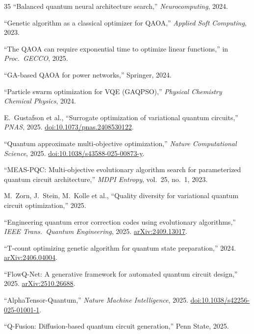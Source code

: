 \documentclass[11pt]{article}
\begin{document}
\begin{thebibliography}{35}
``Balanced quantum neural architecture search,''
\emph{Neurocomputing}, 2024.

``Genetic algorithm as a classical optimizer for QAOA,''
\emph{Applied Soft Computing}, 2023.

``The QAOA can require exponential time to optimize linear functions,''
in \emph{Proc.\ GECCO}, 2025.

``GA-based QAOA for power networks,''
Springer, 2024.

``Particle swarm optimization for VQE (GAQPSO),''
\emph{Physical Chemistry Chemical Physics}, 2024.

E.~Gustafson et al.,
``Surrogate optimization of variational quantum circuits,''
\emph{PNAS}, 2025.
\newblock \href{https://www.pnas.org/doi/10.1073/pnas.2408530122}{doi:10.1073/pnas.2408530122}.

``Quantum approximate multi-objective optimization,''
\emph{Nature Computational Science}, 2025.
\newblock \href{https://www.nature.com/articles/s43588-025-00873-y}{doi:10.1038/s43588-025-00873-y}.

``MEAS-PQC: Multi-objective evolutionary algorithm search for parameterized quantum circuit architecture,''
\emph{MDPI Entropy}, vol.~25, no.~1, 2023.

M.~Zorn, J.~Stein, M.~Kolle et al.,
``Quality diversity for variational quantum circuit optimization,''
2025.

``Engineering quantum error correction codes using evolutionary algorithms,''
\emph{IEEE Trans.\ Quantum Engineering}, 2025.
\newblock \href{https://arxiv.org/abs/2409.13017}{arXiv:2409.13017}.

``T-count optimizing genetic algorithm for quantum state preparation,''
2024.
\newblock \href{https://arxiv.org/abs/2406.04004}{arXiv:2406.04004}.

``FlowQ-Net: A generative framework for automated quantum circuit design,''
2025.
\newblock \href{https://arxiv.org/abs/2510.26688}{arXiv:2510.26688}.

``AlphaTensor-Quantum,''
\emph{Nature Machine Intelligence}, 2025.
\newblock \href{https://www.nature.com/articles/s42256-025-01001-1}{doi:10.1038/s42256-025-01001-1}.

``Q-Fusion: Diffusion-based quantum circuit generation,''
Penn State, 2025.


\end{thebibliography}
\end{document}
